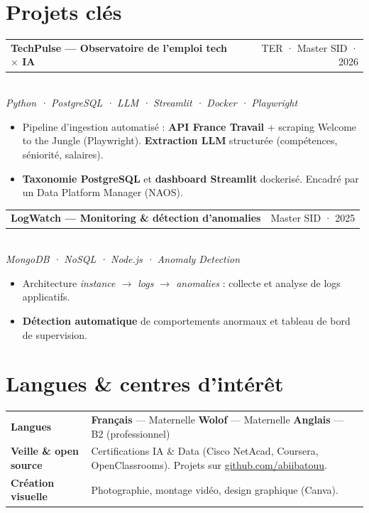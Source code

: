\documentclass[10pt,a4paper]{article}
\makeatletter
\newcommand{\cvproject}[3]{%
  \noindent
  \begin{tabularx}{\linewidth}{@{}X r@{}}
    \textbf{#1} & {\small\color{textlight} #2} \\
  \end{tabularx}\\[-1pt]%
  {\small\itshape\color{accentlight} #3}\par%
}
\makeatother
\begin{document}
\section*{Projets clés}

\cvproject{TechPulse — Observatoire de l'emploi tech $\times$ IA}{TER · Master SID · 2026}{Python · PostgreSQL · LLM · Streamlit · Docker · Playwright}
\vspace{-2pt}
\begin{itemize}
  \item Pipeline d'ingestion automatisé : \textbf{API France Travail} + scraping Welcome to the Jungle (Playwright). \textbf{Extraction LLM} structurée (compétences, séniorité, salaires).
  \item \textbf{Taxonomie PostgreSQL} et \textbf{dashboard Streamlit} dockerisé. Encadré par un Data Platform Manager (NAOS).
\end{itemize}
\vspace{3pt}

\cvproject{LogWatch — Monitoring \& détection d'anomalies}{Master SID · 2025}{MongoDB · NoSQL · Node.js · Anomaly Detection}
\vspace{-2pt}
\begin{itemize}
  \item Architecture \emph{instance $\rightarrow$ logs $\rightarrow$ anomalies} : collecte et analyse de logs applicatifs.
  \item \textbf{Détection automatique} de comportements anormaux et tableau de bord de supervision.
\end{itemize}

\section*{Langues \& centres d'intérêt}
\noindent
\begin{tabularx}{\linewidth}{@{}>{\bfseries\small}p{3.4cm}@{}X@{}}
Langues               & \small \textbf{Français} — Maternelle \quad{\color{accent}\textbar}\quad \textbf{Wolof} — Maternelle \quad{\color{accent}\textbar}\quad \textbf{Anglais} — B2 (professionnel) \\[4pt]
Veille \& open source & \small Certifications IA \& Data (Cisco NetAcad, Coursera, OpenClassrooms). Projets sur \href{https://github.com/abiibatouu}{github.com/abiibatouu}. \\[4pt]
Création visuelle     & \small Photographie, montage vidéo, design graphique (Canva). \\
\end{tabularx}
\end{document}
